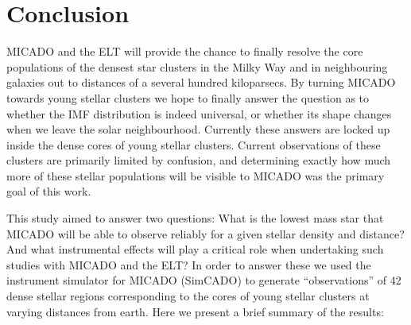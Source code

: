 \section{Conclusion}
\label{sec:conclusion}

MICADO and the ELT will provide the chance to finally resolve the core populations of the densest star clusters in the Milky Way and in neighbouring galaxies out to distances of a several hundred kiloparsecs. By turning MICADO towards young stellar clusters we hope to finally answer the question as to whether the IMF distribution is indeed universal, or whether its shape changes when we leave the solar neighbourhood. Currently these answers are locked up inside the dense cores of young stellar clusters. Current observations of these clusters are primarily limited by confusion, and determining exactly how much more of these stellar populations will be visible to MICADO was the primary goal of this work.

This study aimed to answer two questions: What is the lowest mass star that MICADO will be able to observe reliably for a given stellar density and distance? And what instrumental effects will play a critical role when undertaking such studies with MICADO and the ELT? In order to answer these we used the instrument simulator for MICADO (SimCADO) to generate ``observations'' of 42 dense stellar regions corresponding to the cores of young stellar clusters at varying distances from earth. Here we present a brief summary of the results:

